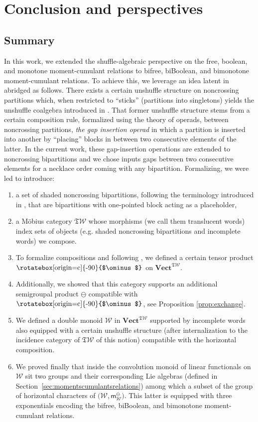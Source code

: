 \documentclass[pdftex]{sigma}
\newcommand\overt{\mathbin{\text{\rotatebox[origin=c]{-90}{$\ominus$}}}}
\newcommand{\SWc}{{\mathfrak{T}\mathcal{W}}}
\newcommand\IWc{\mathcal{W}}
\newcommand\hp{\mathsf{m}^{\ominus}}
\newcommand\hpIWc{\hp_{\IWc}}
\newcommand\CAT[1]{\mathbf{#1}}
\newcommand{\Vect}{\CAT{Vect}}
\newcommand\icsw{ \Vect^{\SWc} }
\numberwithin{equation}{section}
\begin{document}
\section{Conclusion and perspectives}

\subsection{Summary}

In this work, we extended the shuffle-algebraic perspective on the free, boolean, and monotone moment-cumulant relations to bifree, biBoolean, and bimonotone moment-cumulant relations. To achieve this, we leverage an idea latent in \cite{ebrahimi2020operads} abridged as follows.
There exists a certain unshuffle structure on noncrossing partitions which, when restricted to ``sticks'' (partitions into singletons) yields the unshuffle coalgebra introduced in \cite{ebrahimi2015cumulants}. That former unshuffle structure stems from a certain composition rule, formalized using the theory of operads, between noncrossing partitions, \emph{the gap insertion operad} in which a partition is inserted into another by ``placing'' blocks in between two consecutive elements of the latter.
In the current work, these gap-insertion operations are extended to noncrossing bipartitions and we chose inputs gaps between two consecutive elements for a necklace order coming with any bipartition. Formalizing, we were led to introduce:
\begin{enumerate}\itemsep=0pt
\item a set of shaded noncrossing bipartitions, following the terminology introduced in \cite{charlesworth2015combinatorics}, that are bipartitions with one-pointed block acting as a placeholder,
\item a M\"obius category $\SWc$ whose morphisms (we call them translucent words) index sets of objects (e.g. shaded noncrossing bipartitions and incomplete words) we compose.
\item To formalize compositions and following \cite{content1980categories}, we defined a certain tensor product $\overt$ on $\icsw$.
\item Additionally, we showed that this category supports an additional semigroupal product $\ominus$ compatible with $\overt$, see Proposition \ref{prop:exchange}.
\item We defined a double monoid $\mathcal{W}$ in $\icsw$ supported by incomplete words also equipped with a certain unshuffle structure (after internalization to the incidence category of $\SWc$ of this notion) compatible with the horizontal composition.
\item We proved finally that inside the convolution monoid of linear functionals on $\mathcal{W}$ sit two groups and their corresponding Lie algebras (defined in Section~\ref{sec:momentscumulantsrelations}) among which a subset of the group of horizontal characters of $\big(\mathcal{W},\hpIWc\big)$. This latter is equipped with three exponentials encoding the bifree, biBoolean, and bimonotone moment-cumulant relations.
\end{enumerate}
\end{document}
